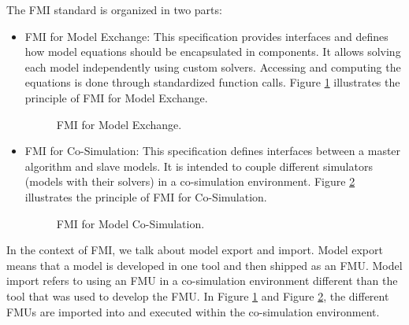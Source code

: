 The FMI standard is organized in two parts:
\begin{itemize}
\item FMI for Model Exchange:
This specification provides interfaces and defines how model equations should be encapsulated in components. It allows solving each model independently using custom solvers. Accessing and computing the equations is done through standardized function calls. Figure \ref{fig:fmimdlexg} illustrates the principle of FMI for Model Exchange.

\begin{figure}[phbt]
\centering

\caption{FMI for Model Exchange.}
\label{fig:fmimdlexg}
\end{figure}

\item FMI for Co-Simulation:
This specification defines interfaces between a master algorithm and slave models. It is intended to couple different simulators (models with their solvers) in a co-simulation environment. Figure \ref{fig:fmicosim} illustrates the principle of FMI for Co-Simulation.

\begin{figure}[phbt]
\centering

\caption{FMI for Model Co-Simulation.}
\label{fig:fmicosim}
\end{figure} 
\end{itemize}

In the context of FMI, we talk about model export and import. Model export means that a model is developed in one tool and then shipped as an FMU. Model import refers to using an FMU in a co-simulation environment different than the tool that was used to develop the FMU. In Figure \ref{fig:fmimdlexg} and Figure \ref{fig:fmicosim}, the different FMUs are imported into and executed within the co-simulation environment.




